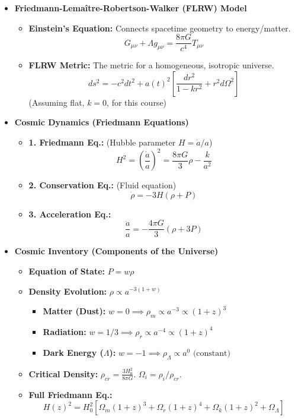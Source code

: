 \documentclass{sciposter}
\begin{document}
\begin{multicols}{3}
\begin{itemize}
    \item \textbf{Friedmann-Lemaître-Robertson-Walker (FLRW) Model}
    \begin{itemize}
        \item \textbf{Einstein's Equation:} Connects spacetime geometry to energy/matter.
        $$G_{\mu\nu} + \Lambda g_{\mu\nu} = \frac{8\pi G}{c^{4}}T_{\mu\nu}$$
        \item \textbf{FLRW Metric:} The metric for a homogeneous, isotropic universe.
        $$ds^{2} = -c^{2}dt^{2} + a(t)^{2}\left[\frac{dr^{2}}{1-kr^{2}} + r^{2}d\Omega^{2}\right]$$
        (Assuming flat, $k=0$, for this course)
    \end{itemize}

    \item \textbf{Cosmic Dynamics (Friedmann Equations)}
    \begin{itemize}
        \item \textbf{1. Friedmann Eq.:} (Hubble parameter $H = \dot{a}/a$)
        $$H^2 = \left(\frac{\dot{a}}{a}\right)^2 = \frac{8\pi G}{3}\rho - \frac{k}{a^2}$$
        \item \textbf{2. Conservation Eq.:} (Fluid equation)
        $$\dot{\rho} = -3H(\rho + P)$$
        \item \textbf{3. Acceleration Eq.:}
        $$\frac{\ddot{a}}{a} = -\frac{4\pi G}{3}(\rho + 3P)$$
    \end{itemize}

    \item \textbf{Cosmic Inventory (Components of the Universe)}
    \begin{itemize}
        \item \textbf{Equation of State:} $P = w\rho$
        \item \textbf{Density Evolution:} $\rho \propto a^{-3(1+w)}$
        \begin{itemize}
            \item \textbf{Matter (Dust):} $w=0 \implies \rho_m \propto a^{-3} \propto (1+z)^3$
            \item \textbf{Radiation:} $w=1/3 \implies \rho_r \propto a^{-4} \propto (1+z)^4$
            \item \textbf{Dark Energy ($\Lambda$):} $w=-1 \implies \rho_\Lambda \propto a^{0} \text{ (constant)}$
        \end{itemize}
        \item \textbf{Critical Density:} $\rho_{cr} = \frac{3H_0^2}{8\pi G}$. $\Omega_i = \rho_i / \rho_{cr}$.
        \item \textbf{Full Friedmann Eq.:}
        $$H(z)^2 = H_0^2 \left[ \Omega_m(1+z)^3 + \Omega_r(1+z)^4 + \Omega_k(1+z)^2 + \Omega_\Lambda \right]$$
    \end{itemize}


\end{itemize}
\end{multicols}
\end{document}

